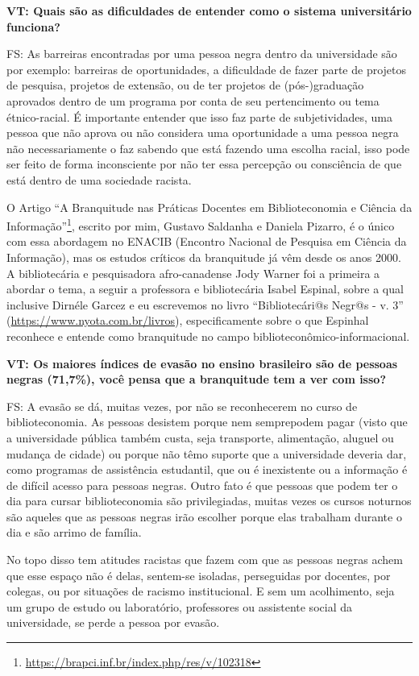\documentclass[a4paper,
fontsize=11pt,
oneside,
numbers=noperiodatend,
parskip=half-,
bibliography=totoc,
final
]{scrartcl}
\begin{document}
\textbf{VT: Quais são as dificuldades de entender como o sistema
universitário funciona?}

FS: As barreiras encontradas por uma pessoa negra dentro da universidade
são por exemplo: barreiras de oportunidades, a dificuldade de fazer
parte de projetos de pesquisa, projetos de extensão, ou de ter projetos
de (pós-)graduação aprovados dentro de um programa por conta de seu
pertencimento ou tema étnico-racial. É importante entender que isso faz
parte de subjetividades, uma pessoa que não aprova ou não considera uma
oportunidade a uma pessoa negra não necessariamente o faz sabendo que
está fazendo uma escolha racial, isso pode ser feito de forma
inconsciente por não ter essa percepção ou consciência de que está
dentro de uma sociedade racista.

O Artigo \enquote{A Branquitude nas Práticas Docentes em Biblioteconomia
e Ciência da Informação}\footnote{\url{https://brapci.inf.br/index.php/res/v/102318}},
escrito por mim, Gustavo Saldanha e Daniela Pizarro, é o único com essa
abordagem no ENACIB (Encontro Nacional de Pesquisa em Ciência da
Informação), mas os estudos críticos da branquitude já vêm desde os anos
2000. A bibliotecária e pesquisadora afro-canadense Jody Warner foi a
primeira a abordar o tema, a seguir a professora e bibliotecária Isabel
Espinal, sobre a qual inclusive Dirnéle Garcez e eu escrevemos no livro
\enquote{Bibliotecári@s Negr@s - v. 3}
(\url{https://www.nyota.com.br/livros}), especificamente sobre o que
Espinhal reconhece e entende como branquitude no campo
biblioteconômico-informacional.

\textbf{VT: Os maiores índices de evasão no ensino brasileiro são de
pessoas negras (71,7\%), você pensa que a branquitude tem a ver com
isso?}

FS: A evasão se dá, muitas vezes, por não se reconhecerem no curso de
biblioteconomia. As pessoas desistem porque nem semprepodem pagar (visto
que a universidade pública também custa, seja transporte, alimentação,
aluguel ou mudança de cidade) ou porque não têmo suporte que a
universidade deveria dar, como programas de assistência estudantil, que
ou é inexistente ou a informação é de difícil acesso para pessoas
negras. Outro fato é que pessoas que podem ter o dia para cursar
biblioteconomia são privilegiadas, muitas vezes os cursos noturnos são
aqueles que as pessoas negras irão escolher porque elas trabalham
durante o dia e são arrimo de família.

No topo disso tem atitudes racistas que fazem com que as pessoas negras
achem que esse espaço não é delas, sentem-se isoladas, perseguidas por
docentes, por colegas, ou por situações de racismo institucional. E sem
um acolhimento, seja um grupo de estudo ou laboratório, professores ou
assistente social da universidade, se perde a pessoa por evasão.
\end{document}
